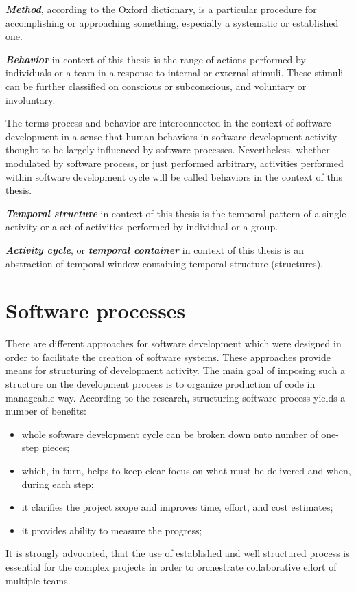 \textit{\textbf{Method}}, according to the Oxford dictionary, is a particular procedure for 
accomplishing or approaching something, especially a systematic or established one.

\textit{\textbf{Behavior}} in context of this thesis is the range of actions performed by 
individuals or a team in a response to internal or external stimuli. These stimuli can be
further classified on conscious or subconscious, and voluntary or involuntary. 

The terms process and behavior are interconnected in the context of software development
in a sense that human behaviors in software development activity thought to be largely influenced 
by software processes. Nevertheless, whether modulated by software process, or just 
performed arbitrary, activities performed within software development cycle will be called 
behaviors in the context of this thesis.

\textit{\textbf{Temporal structure}} in context of this thesis is the temporal pattern of
a single activity or a set of activities performed by individual or a group. 

\textit{\textbf{Activity cycle}}, or \textit{\textbf{temporal container}} in context of 
this thesis is an abstraction of temporal window containing temporal structure (structures).

\section{Software processes}\label{software.processes}
There are different approaches for software development which were designed in order to 
facilitate the creation of software systems. These approaches provide means for 
structuring of development activity. The main goal of imposing such a structure on the 
development process is to organize production of code in manageable way. 
According to the research, structuring software process yields a number of benefits:
\begin{itemize}
 \item whole software development cycle can be broken down onto number of one-step pieces;
 \item which, in turn, helps to keep clear focus on what must be delivered and when, during each step;
 \item it clarifies the project scope and improves time, effort, and cost estimates;
 \item it provides ability to measure the progress;
\end{itemize}
It is strongly advocated, that the use of established and well structured process is 
essential for the complex projects in order to orchestrate collaborative effort 
of multiple teams. 

